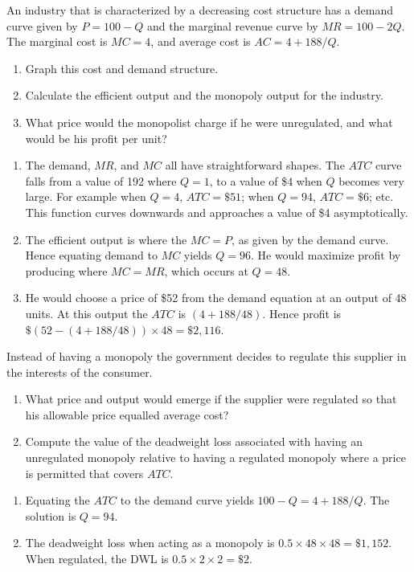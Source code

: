 \begin{enumialphparenastyle}
\begin{ex}\label{ex:ch14ex3}
An industry that is characterized by a decreasing cost structure has a demand curve given by $P=100-Q$ and the marginal revenue curve by $MR=100-2Q$. The marginal cost is $MC=4$, and average cost is $AC=4+188/Q$.
\begin{enumerate}
	\item	Graph this cost and demand structure.
	\item	Calculate the efficient output and the monopoly output for the industry.
	\item	What price would the monopolist charge if he were unregulated, and what would be his profit per unit?
\end{enumerate}
\begin{sol}
\begin{enumerate}
	\item	The demand, $MR$, and $MC$ all have straightforward shapes. The $ATC$ curve falls from a value of 192 where $Q=1$, to a value of \$4 when $Q$ becomes very large. For example when $Q=4$, $ATC=\$51$; when $Q=94$, $ATC=\$6$; etc. This function curves downwards and approaches a value of \$4 asymptotically.
	\item	The efficient output is where the $MC=P$, as given by the demand curve. Hence equating demand to $MC$ yields $Q=96$. He would maximize profit by producing where $MC=MR$, which occurs at $Q=48$.
	\item	He would choose a price of \$52 from the demand equation at an output of 48 units. At this output the $ATC$ is $(4+188/48)$. Hence profit is $\$(52-(4+188/48))\times 48=\$2,116$.
\end{enumerate}
\end{sol}
\end{ex}

\begin{ex}\label{ex:ch14ex4}
Instead of having a monopoly the government decides to regulate this supplier in the interests of the consumer.
\begin{enumerate}
	\item	What price and output would emerge if the supplier were regulated so that his allowable price equalled average cost? 
	\item	Compute the value of the deadweight loss associated with having an unregulated monopoly relative to having a regulated monopoly where a price is permitted that covers $ATC$.
\end{enumerate}
\begin{sol}
\begin{enumerate}
	\item	Equating the $ATC$ to the demand curve yields $100-Q=4+188/Q$. The solution is $Q=94$.
	\item	The deadweight loss when acting as a monopoly is $0.5\times 48\times 48=\$1,152$. When regulated, the DWL is $0.5\times 2\times 2=\$2$.
\end{enumerate}
\end{sol}
\end{ex}


\end{enumialphparenastyle}
